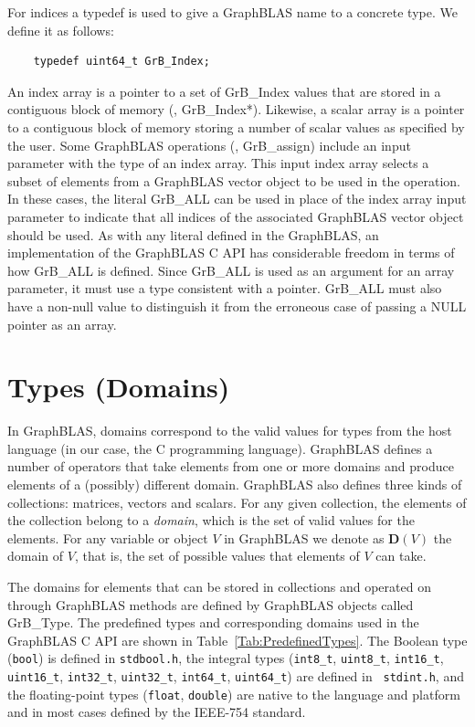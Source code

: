 For indices a {\sf typedef} is used to give a GraphBLAS name to a concrete type. We define it as follows:

\begin{verbatim}
    typedef uint64_t GrB_Index;
\end{verbatim}

An index array is a pointer to a set of {\sf GrB\_Index} values that are 
stored in a contiguous block of memory (\ie, {\sf GrB\_Index*}).
Likewise, a scalar array is a pointer to a contiguous block of memory 
storing a number of scalar values as specified by the user.
Some GraphBLAS operations (\eg, {\sf GrB\_assign})  include an input parameter with the type of an index array. 
This input index array selects a subset of elements from a GraphBLAS vector object to be used in the operation.
In these cases, the literal {\sf GrB\_ALL} 
can be used in place of the index array input parameter to indicate that all indices 
of the associated GraphBLAS vector object should be used.
As with any literal defined in the GraphBLAS, an implementation of the GraphBLAS C API has considerable 
freedom in terms of how {\sf GrB\_ALL} is defined.  Since {\sf GrB\_ALL} is used as an argument for an array 
parameter, it must use a type consistent with a pointer. {\sf GrB\_ALL} must also have a non-null
value to distinguish it from the erroneous case of passing a {\sf NULL} pointer as an array.

\section{Types (Domains)}
\label{Sec:Domains}

In GraphBLAS, domains correspond to the valid values for types from the
host language (in our case, the C programming language).  GraphBLAS defines
a number of operators that take elements from one or more domains and produce elements of a (possibly) different domain.  GraphBLAS also defines 
three kinds of collections: matrices, vectors and scalars.  For any given 
collection, the elements of the collection belong to a \emph{domain}, which 
is the set of valid values for the elements.  For any variable 
or object $V$ in GraphBLAS we denote as $\mathbf{D}(V)$ the domain of $V$,
that is, the set of possible values that elements of $V$ can take.  

The domains for elements that can be stored in collections and operated on
through GraphBLAS methods are defined by GraphBLAS objects called {\sf GrB\_Type}.
The predefined types and corresponding domains used in the GraphBLAS C API are
shown in Table~\ref{Tab:PredefinedTypes}.  The Boolean type ({\tt bool})
is defined in {\tt stdbool.h}, the integral types ({\tt int8\_t},
{\tt uint8\_t}, {\tt int16\_t}, {\tt uint16\_t}, {\tt int32\_t},
{\tt uint32\_t}, {\tt int64\_t}, {\tt uint64\_t}) are defined in {\tt
stdint.h}, and the floating-point types ({\tt float}, {\tt double}) are
native to the language and platform and in most cases defined by the 
IEEE-754 standard.

